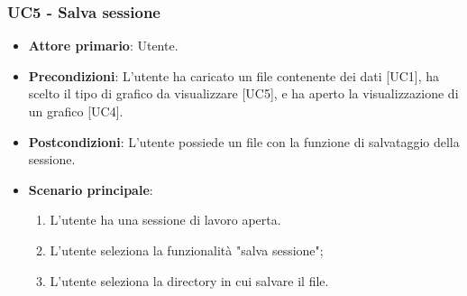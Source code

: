 \subsubsection{UC5 - Salva sessione}
\begin{itemize}
	\item \textbf{Attore primario}: Utente.
	\item \textbf{Precondizioni}: L'utente ha caricato un file contenente dei dati [UC1], ha scelto il tipo di grafico da visualizzare [UC5], e ha aperto la visualizzazione di un grafico [UC4].
	\item \textbf{Postcondizioni}: L'utente possiede un file con la funzione di salvataggio della sessione.
	\item \textbf{Scenario principale}:
		\begin{enumerate}
			\item L'utente ha una sessione di lavoro aperta.
			\item L'utente seleziona la funzionalità "salva sessione";
			\item L'utente seleziona la directory in cui salvare il file.
		\end{enumerate}
\end{itemize}
